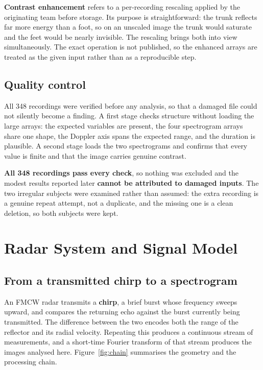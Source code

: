 \textbf{Contrast enhancement} refers to a per-recording rescaling applied by the
originating team before storage. Its purpose is straightforward: the trunk
reflects far more energy than a foot, so on an unscaled image the trunk would
saturate and the feet would be nearly invisible. The rescaling brings both into
view simultaneously. The exact operation is not published, so the enhanced
arrays are treated as the given input rather than as a reproducible step.

\subsection{Quality control}
\label{sec:qc}

All 348 recordings were verified before any analysis, so that a damaged file
could not silently become a finding. A first stage checks structure without
loading the large arrays: the expected variables are present, the four
spectrogram arrays share one shape, the Doppler axis spans the expected range,
and the duration is plausible. A second stage loads the two spectrograms and
confirms that every value is finite and that the image carries genuine
contrast.

\textbf{All 348 recordings pass every check}, so nothing was excluded and the
modest results reported later \textbf{cannot be attributed to damaged inputs}.
The two irregular subjects were examined rather than assumed: the extra
recording is a genuine repeat attempt, not a duplicate, and the missing one is
a clean deletion, so both subjects were kept.

\section{Radar System and Signal Model}
\label{sec:radar}

\subsection{From a transmitted chirp to a spectrogram}

An FMCW radar transmits a \textbf{chirp}, a brief burst whose frequency sweeps
upward, and compares the returning echo against the burst currently being
transmitted. The difference between the two encodes both the range of the
reflector and its radial velocity. Repeating this produces a continuous stream
of measurements, and a short-time Fourier transform of that stream produces the
images analysed here. Figure~\ref{fig:chain} summarises the geometry and the
processing chain.

